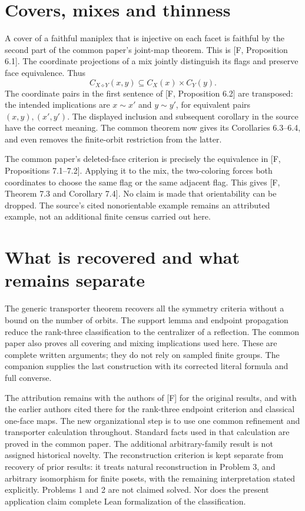 \documentclass[a4paper,11pt]{article}
\begin{document}
\section{Covers, mixes and thinness}
A cover of a faithful maniplex that is injective on each facet is
faithful by the second part of the common paper's joint-map theorem.
This is [F, Proposition 6.1]. The coordinate projections of a mix
jointly distinguish its flags and preserve face equivalence. Thus
\[
 C_{X\diamond Y}(x,y)\subseteq C_X(x)\times C_Y(y).
\]
The coordinate pairs in the first sentence of [F, Proposition 6.2]
are transposed: the intended implications are $x\sim x'$ and
$y\sim y'$, for equivalent pairs $(x,y),(x',y')$. The displayed
inclusion and subsequent corollary in the source have the correct
meaning. The common theorem now gives its Corollaries 6.3--6.4,
and even removes the finite-orbit restriction from the latter.

The common paper's deleted-face criterion is precisely the
equivalence in [F, Propositions 7.1--7.2]. Applying it to the mix,
the two-coloring forces both coordinates to choose the same flag
or the same adjacent flag. This gives [F, Theorem 7.3 and Corollary
7.4]. No claim is made that orientability can be dropped. The
source's cited nonorientable example remains an attributed example,
not an additional finite census carried out here.

\section{What is recovered and what remains separate}
The generic transporter theorem recovers all the symmetry criteria
without a bound on the number of orbits. The support lemma and
endpoint propagation reduce the rank-three classification to the
centralizer of a reflection. The common paper also proves all
covering and mixing implications used here. These are complete
written arguments; they do not rely on sampled finite groups.
The companion supplies the last construction with its corrected
literal formula and full converse.

The attribution remains with the authors of [F] for the original
results, and with the earlier authors cited there for the rank-three
endpoint criterion and classical one-face maps. The new organizational
step is to use one common refinement and transporter calculation
throughout. Standard facts used in that calculation are proved in
the common paper. The additional arbitrary-family result is not
assigned historical novelty. The reconstruction criterion is kept
separate from recovery of prior results: it treats natural
reconstruction in Problem 3, and arbitrary isomorphism for finite
posets, with the remaining interpretation stated explicitly.
Problems 1 and 2 are not claimed solved. Nor does the present
application claim complete Lean formalization of the classification.
\end{document}
